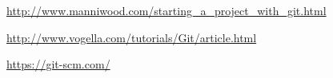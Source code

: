 \begin{thebibliography}{99999}
\singlespace\normalsize

  \url{http://www.manniwood.com/starting_a_project_with_git.html}

  \url{http://www.vogella.com/tutorials/Git/article.html}

  \url{https://git-scm.com/}

\end{thebibliography}
